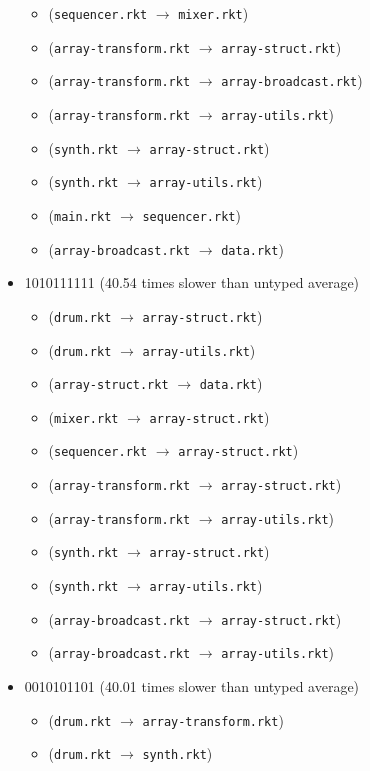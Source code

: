 \documentclass{article}
\newcommand{\mono}[1]{\texttt{#1}}
\begin{document}
\begin{itemize}
\begin{itemize}
  \item (\mono{sequencer.rkt} $\rightarrow$ \mono{mixer.rkt})
  \item (\mono{array-transform.rkt} $\rightarrow$ \mono{array-struct.rkt})
  \item (\mono{array-transform.rkt} $\rightarrow$ \mono{array-broadcast.rkt})
  \item (\mono{array-transform.rkt} $\rightarrow$ \mono{array-utils.rkt})
  \item (\mono{synth.rkt} $\rightarrow$ \mono{array-struct.rkt})
  \item (\mono{synth.rkt} $\rightarrow$ \mono{array-utils.rkt})
  \item (\mono{main.rkt} $\rightarrow$ \mono{sequencer.rkt})
  \item (\mono{array-broadcast.rkt} $\rightarrow$ \mono{data.rkt})
  \end{itemize}
\item 1010111111 (40.54 times slower than untyped average)
  \begin{itemize}
  \item (\mono{drum.rkt} $\rightarrow$ \mono{array-struct.rkt})
  \item (\mono{drum.rkt} $\rightarrow$ \mono{array-utils.rkt})
  \item (\mono{array-struct.rkt} $\rightarrow$ \mono{data.rkt})
  \item (\mono{mixer.rkt} $\rightarrow$ \mono{array-struct.rkt})
  \item (\mono{sequencer.rkt} $\rightarrow$ \mono{array-struct.rkt})
  \item (\mono{array-transform.rkt} $\rightarrow$ \mono{array-struct.rkt})
  \item (\mono{array-transform.rkt} $\rightarrow$ \mono{array-utils.rkt})
  \item (\mono{synth.rkt} $\rightarrow$ \mono{array-struct.rkt})
  \item (\mono{synth.rkt} $\rightarrow$ \mono{array-utils.rkt})
  \item (\mono{array-broadcast.rkt} $\rightarrow$ \mono{array-struct.rkt})
  \item (\mono{array-broadcast.rkt} $\rightarrow$ \mono{array-utils.rkt})
  \end{itemize}
\item 0010101101 (40.01 times slower than untyped average)
  \begin{itemize}
  \item (\mono{drum.rkt} $\rightarrow$ \mono{array-transform.rkt})
  \item (\mono{drum.rkt} $\rightarrow$ \mono{synth.rkt})

\end{itemize}
\end{itemize}
\end{document}

